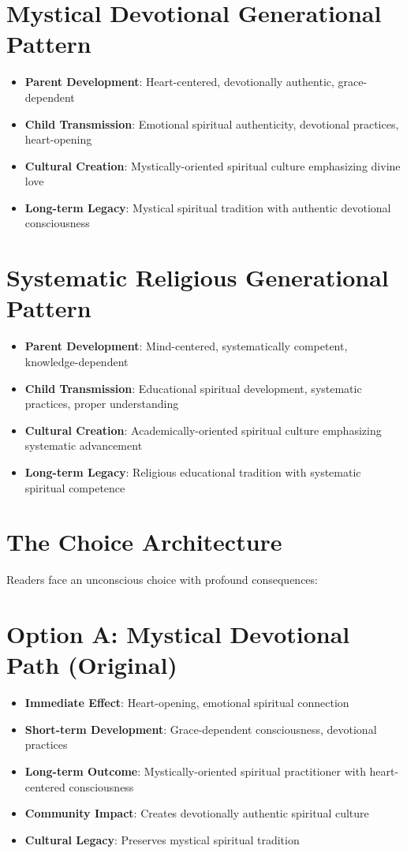 \documentclass[11pt,twoside]{book}
\begin{document}
\section*{Mystical Devotional Generational Pattern}
\label{sec:orgb10e09e}
\begin{itemize}
\item \textbf{\textbf{Parent Development}}: Heart-centered, devotionally authentic, grace-dependent
\item \textbf{\textbf{Child Transmission}}: Emotional spiritual authenticity, devotional practices, heart-opening
\item \textbf{\textbf{Cultural Creation}}: Mystically-oriented spiritual culture emphasizing divine love
\item \textbf{\textbf{Long-term Legacy}}: Mystical spiritual tradition with authentic devotional consciousness
\end{itemize}
\section*{Systematic Religious Generational Pattern}
\label{sec:org813967c}
\begin{itemize}
\item \textbf{\textbf{Parent Development}}: Mind-centered, systematically competent, knowledge-dependent
\item \textbf{\textbf{Child Transmission}}: Educational spiritual development, systematic practices, proper understanding
\item \textbf{\textbf{Cultural Creation}}: Academically-oriented spiritual culture emphasizing systematic advancement
\item \textbf{\textbf{Long-term Legacy}}: Religious educational tradition with systematic spiritual competence
\end{itemize}
\section*{The Choice Architecture}
\label{sec:orgcf4a2a1}

Readers face an unconscious choice with profound consequences:
\section*{Option A: Mystical Devotional Path (Original)}
\label{sec:org6f2358a}
\begin{itemize}
\item \textbf{\textbf{Immediate Effect}}: Heart-opening, emotional spiritual connection
\item \textbf{\textbf{Short-term Development}}: Grace-dependent consciousness, devotional practices
\item \textbf{\textbf{Long-term Outcome}}: Mystically-oriented spiritual practitioner with heart-centered consciousness
\item \textbf{\textbf{Community Impact}}: Creates devotionally authentic spiritual culture
\item \textbf{\textbf{Cultural Legacy}}: Preserves mystical spiritual tradition
\end{itemize}
\end{document}
